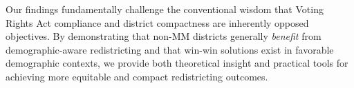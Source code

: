Our findings fundamentally challenge the conventional wisdom that Voting Rights Act compliance and district compactness are inherently opposed objectives. By demonstrating that non-MM districts generally \emph{benefit} from demographic-aware redistricting and that win-win solutions exist in favorable demographic contexts, we provide both theoretical insight and practical tools for achieving more equitable and compact redistricting outcomes.
